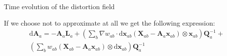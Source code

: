 \documentclass[oneside, a4paper, onecolumn, 11pt]{article}
\renewcommand{\AA}{\mathbf{A}}
\newcommand{\xx}{\mathbf{x}}
\newcommand{\XX}{\mathbf{X}}
\newcommand{\diff}{\mathrm{d}}
\newcommand{\QQ}{\mathbf{Q}}
\newcommand{\LL}{\mathbf{L}}
\begin{document}
\begin{subsection} {Time evolution of the distortion field}

If we choose not to approximate at all we get the following expression:
\begin{equation}
    \begin{aligned}
    \diff \AA_a = - \AA_a \LL_a +
    \left(\sum_b \nabla w_{ab} \cdot \diff \xx_{ab} \left(\XX_{ab} - \AA_a \xx_{ab}
    \right) \otimes \xx_{ab}\right)\QQ_a^{-1} +\\
    \left(\sum_b w_{ab} \left(\XX_{ab} - \AA_a \xx_{ab}
    \right) \otimes \diff \xx_{ab}\right)\QQ_a^{-1}
    \end{aligned}
\end{equation}

\end{subsection}
\end{document}
